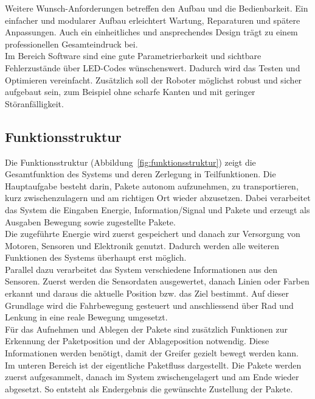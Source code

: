 \documentclass[11pt,a4paper]{article}
\begin{document}
		\noindent
		Weitere Wunsch-Anforderungen betreffen den Aufbau und die Bedienbarkeit. Ein einfacher und modularer Aufbau erleichtert Wartung, Reparaturen und spätere Anpassungen. Auch ein einheitliches und ansprechendes Design trägt zu einem professionellen Gesamteindruck bei.
		\\
		
		\noindent
		Im Bereich Software sind eine gute Parametrierbarkeit und sichtbare Fehlerzustände über LED-Codes wünschenswert. Dadurch wird das Testen und Optimieren vereinfacht. Zusätzlich soll der Roboter möglichst robust und sicher aufgebaut sein, zum Beispiel ohne scharfe Kanten und mit geringer Störanfälligkeit.
	
\newpage
	\subsection{Funktionsstruktur}
	
		\begin{minipage}[t]{\textwidth}
			
		Die Funktionsstruktur (Abbildung~\ref{fig:funktionsstruktur}) zeigt die Gesamtfunktion des Systems und deren Zerlegung in Teilfunktionen. Die Hauptaufgabe besteht darin, Pakete autonom aufzunehmen, zu transportieren, kurz zwischenzulagern und am richtigen Ort wieder abzusetzen. Dabei verarbeitet das System die Eingaben Energie, Information/Signal und Pakete und erzeugt als Ausgaben Bewegung sowie zugestellte Pakete.\\
		
		Die zugeführte Energie wird zuerst gespeichert und danach zur Versorgung von Motoren, Sensoren und Elektronik genutzt. Dadurch werden alle weiteren Funktionen des Systems überhaupt erst möglich.\\
		
		Parallel dazu verarbeitet das System verschiedene Informationen aus den Sensoren. Zuerst werden die Sensordaten ausgewertet, danach Linien oder Farben erkannt und daraus die aktuelle Position bzw. das Ziel bestimmt. Auf dieser Grundlage wird die Fahrbewegung gesteuert und anschliessend über Rad und Lenkung in eine reale Bewegung umgesetzt.\\
		
		Für das Aufnehmen und Ablegen der Pakete sind zusätzlich Funktionen zur Erkennung der Paketposition und der Ablageposition notwendig. Diese Informationen werden benötigt, damit der Greifer gezielt bewegt werden kann.\\
		
		Im unteren Bereich ist der eigentliche Paketfluss dargestellt. Die Pakete werden zuerst aufgesammelt, danach im System zwischengelagert und am Ende wieder abgesetzt. So entsteht als Endergebnis die gewünschte Zustellung der Pakete.\\
		
		\end{minipage}
		
\end{document}
